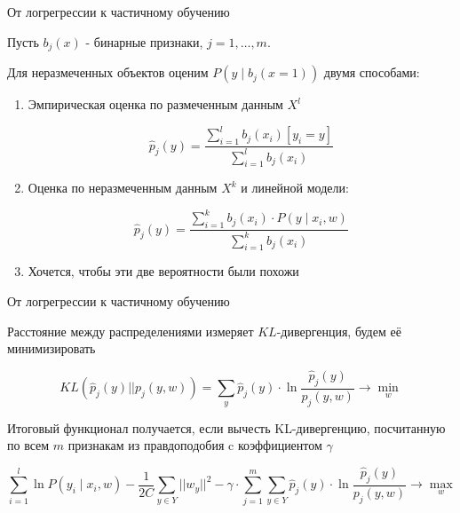 \documentclass[notes,12pt, aspectratio=169]{beamer}
\newenvironment{wideitemize}{\itemize\addtolength{\itemsep}{10pt}}{\enditemize}
\begin{document}
\begin{frame}{От логрегрессии к частичному обучению}
\begin{wideitemize}
	\item Пусть $b_j(x)$ - бинарные признаки, $j = 1, \ldots, m$.

	\item Для неразмеченных объектов оценим $P(y \mid b_j(x = 1))$ двумя способами: 
	
	\begin{enumerate}
		\item  Эмпирическая оценка по размеченным данным $X^l$

$$
\hat p_j(y) = \frac{\sum_{i=1}^l b_j(x_i) [y_i = y]}{\sum_{i=1}^l b_j(x_i)}
$$

		
		\item  Оценка по неразмеченным данным $X^k$ и линейной модели: 
		
$$
\hat p_j(y) = \frac{\sum_{i=1}^k b_j(x_i) \cdot P(y \mid x_i, w)}{\sum_{i=1}^k b_j(x_i)}
$$		
		\item Хочется, чтобы эти две вероятности были похожи
	\end{enumerate}
	
\end{wideitemize}
\end{frame}


\begin{frame}{От логрегрессии к частичному обучению}
\begin{wideitemize}

\item Расстояние между распределениями измеряет $KL$-дивергенция, будем её минимизировать 

$$
KL(\hat p_j(y) || p_j(y, w)) = \sum_y \hat p_j(y) \cdot \ln \frac{\hat p_j(y)}{p_j(y,w)} \to \min_w 
$$

\item Итоговый функционал получается, если вычесть KL-дивергенцию, посчитанную по всем $m$ признакам из правдоподобия c коэффициентом $\gamma$

$$
\sum_{i=1}^l \ln P(y_i \mid x_i, w) - \frac{1}{2C} \sum_{y \in Y} ||w_y||^2 - \gamma \cdot \sum_{j=1}^m \sum_{y \in Y} \hat p_j(y) \cdot \ln \frac{\hat p_j(y)}{p_j(y,w)}  \to \max_{w}
$$

\end{wideitemize}
\end{frame}
\end{document}
